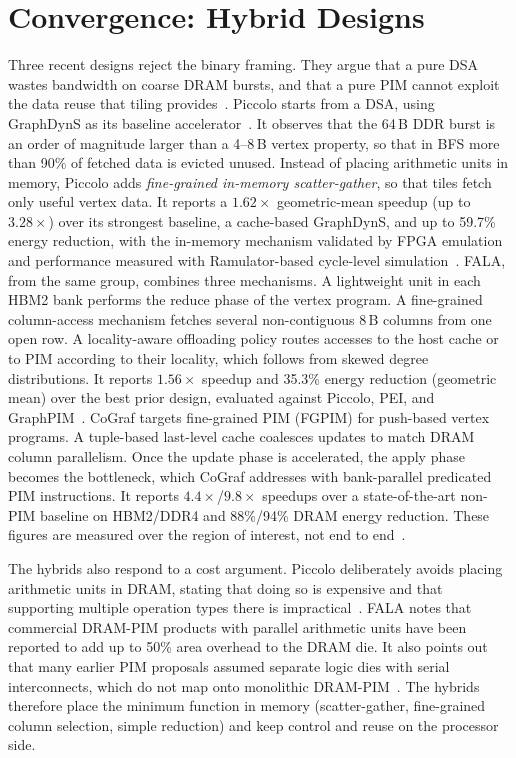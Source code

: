 \documentclass[journal,onecolumn]{IEEEtran}
\begin{document}
\section{Convergence: Hybrid Designs}\label{sec:hybrid}
Three recent designs reject the binary framing. They argue that a pure DSA wastes bandwidth on coarse DRAM bursts, and that a pure PIM cannot exploit the data reuse that tiling provides~\cite{shin2025piccolo,shin2025fala}. Piccolo starts from a DSA, using GraphDynS as its baseline accelerator~\cite{shin2025piccolo}. It observes that the 64\,B DDR burst is an order of magnitude larger than a 4--8\,B vertex property, so that in BFS more than 90\% of fetched data is evicted unused. Instead of placing arithmetic units in memory, Piccolo adds \emph{fine-grained in-memory scatter-gather}, so that tiles fetch only useful vertex data. It reports a $1.62\times$ geometric-mean speedup (up to $3.28\times$) over its strongest baseline, a cache-based GraphDynS, and up to 59.7\% energy reduction, with the in-memory mechanism validated by FPGA emulation and performance measured with Ramulator-based cycle-level simulation~\cite{shin2025piccolo}. FALA, from the same group, combines three mechanisms. A lightweight unit in each HBM2 bank performs the reduce phase of the vertex program. A fine-grained column-access mechanism fetches several non-contiguous 8\,B columns from one open row. A locality-aware offloading policy routes accesses to the host cache or to PIM according to their locality, which follows from skewed degree distributions. It reports $1.56\times$ speedup and 35.3\% energy reduction (geometric mean) over the best prior design, evaluated against Piccolo, PEI, and GraphPIM~\cite{shin2025fala}. CoGraf targets fine-grained PIM (FGPIM) for push-based vertex programs. A tuple-based last-level cache coalesces updates to match DRAM column parallelism. Once the update phase is accelerated, the apply phase becomes the bottleneck, which CoGraf addresses with bank-parallel predicated PIM instructions. It reports $4.4\times$/$9.8\times$ speedups over a state-of-the-art non-PIM baseline on HBM2/DDR4 and 88\%/94\% DRAM energy reduction. These figures are measured over the region of interest, not end to end~\cite{yenimol2026cograf}.

The hybrids also respond to a cost argument. Piccolo deliberately avoids placing arithmetic units in DRAM, stating that doing so is expensive and that supporting multiple operation types there is impractical~\cite{shin2025piccolo}. FALA notes that commercial DRAM-PIM products with parallel arithmetic units have been reported to add up to 50\% area overhead to the DRAM die. It also points out that many earlier PIM proposals assumed separate logic dies with serial interconnects, which do not map onto monolithic DRAM-PIM~\cite{shin2025fala}. The hybrids therefore place the minimum function in memory (scatter-gather, fine-grained column selection, simple reduction) and keep control and reuse on the processor side.
\end{document}
